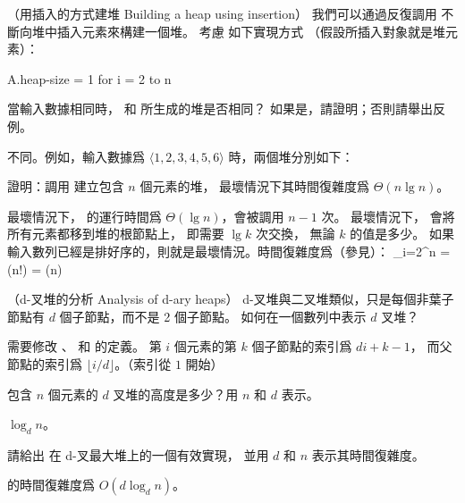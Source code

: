 \startsubject[
  title={Problems},
]

\startPROBLEM
（用插入的方式建堆 Building a heap using insertion）
我們可以通過反復調用  不斷向堆中插入元素來構建一個堆。
考慮  如下實現方式
（假設所插入對象就是堆元素）：

\startCLRSCODE
A.heap-size = 1
for i = 2 to n
\stopCLRSCODE

\startigBase[a]
\startitem
當輸入數據相同時，  和  所生成的堆是否相同？
如果是，請證明；否則請舉出反例。
\stopitem

\startANSWER
不同。例如，輸入數據爲 $\langle 1, 2, 3, 4, 5, 6 \rangle$ 時，兩個堆分別如下：

\startcombination[2*1]
{\externalfigure[output/p6_1_a-1]}{}
{\externalfigure[output/p6_1_a-2]}{}
\stopcombination
\stopANSWER

\startitem
證明：調用  建立包含 $n$ 個元素的堆，
最壞情況下其時間復雜度爲 $\Theta(n\lg{n})$。
\stopitem

\startANSWER
最壞情況下，  的運行時間爲 $\Theta(\lg{n})$，會被調用 $n-1$ 次。
最壞情況下，  會將所有元素都移到堆的根節點上， 即需要 $\lg{k}$ 次交換，
無論 $k$ 的值是多少。
如果輸入數列已經是排好序的，則就是最壞情況。時間復雜度爲（參見\inexercise[lg_n_fac]）：
\startformula
\sum_{i=2}^{n} = \lg(n!) = \Theta(n)
\stopformula
\stopANSWER

\stopigBase
\stopPROBLEM

\startPROBLEM[problem:6-2]
（d-叉堆的分析 Analysis of d-ary heaps）
d-叉堆與二叉堆類似，只是每個非葉子節點有 $d$ 個子節點，而不是 2 個子節點。
\startigBase[a]
\startitem
如何在一個數列中表示 $d$ 叉堆？
\stopitem

\startANSWER
需要修改 、  和  的定義。
第 $i$ 個元素的第 $k$ 個子節點的索引爲 $di + k - 1$，
而父節點的索引爲 $\lfloor i/d \rfloor$。（索引從 $1$ 開始）
\stopANSWER

\startitem
包含 $n$ 個元素的 $d$ 叉堆的高度是多少？用 $n$ 和 $d$ 表示。
\stopitem

\startANSWER
$\log_d{n}$。
\stopANSWER

\startitem
請給出  在 d-叉最大堆上的一個有效實現，
並用 $d$ 和 $n$ 表示其時間復雜度。
\stopitem

\startANSWER
{} 的時間復雜度爲 $O(d\log_d{n})$。
\stopANSWER

